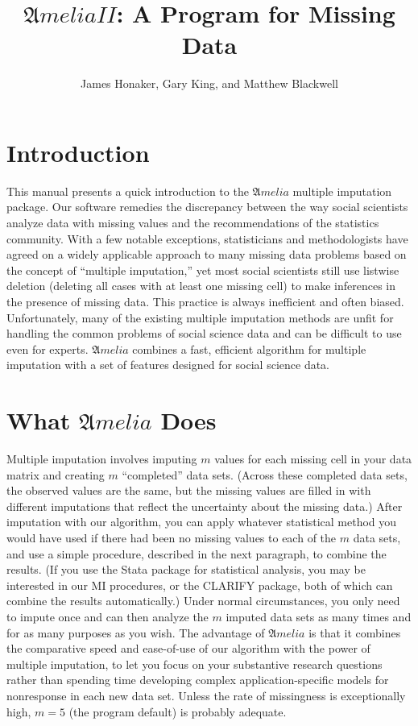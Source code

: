 \documentclass[12pt,titlepage]{article}
\title{${\mathfrak Amelia II}$: A Program for Missing Data}
\author{James Honaker, Gary King, and Matthew Blackwell}
\begin{document}
\maketitle

\tableofcontents
\newpage

\section{Introduction}
\label{sec:intro}

This manual presents a quick introduction to the ${\mathfrak Amelia}$
multiple imputation package.  Our software remedies the discrepancy
between the way social scientists analyze data with missing values and
the recommendations of the statistics community. With a few notable
exceptions, statisticians and methodologists have agreed on a widely
applicable approach to many missing data problems based on the concept
of ``multiple imputation,'' yet most social scientists still use
listwise deletion (deleting all cases with at least one missing cell)
to make inferences in the presence of missing data. This practice is
always inefficient and often biased. Unfortunately, many of the
existing multiple imputation methods are unfit for handling the common
problems of social science data and can be difficult to use even for
experts.  ${\mathfrak Amelia}$ combines a fast, efficient algorithm
for multiple imputation with a set of features designed for social
science data.

\section{What ${\mathfrak Amelia}$ Does}
\label{sec:what}
Multiple imputation involves imputing $m$ values for each missing cell
in your data matrix and creating $m$ ``completed'' data sets.  (Across
these completed data sets, the observed values are the same, but the
missing values are filled in with different imputations that reflect
the uncertainty about the missing data.)  After imputation with our
algorithm, you can apply whatever statistical method you would have
used if there had been no missing values to each of the $m$ data sets,
and use a simple procedure, described in the next paragraph, to
combine the results.  (If you use the Stata package for statistical
analysis, you may be interested in our MI procedures, or the CLARIFY
package, both of which can combine the results automatically.)  Under
normal circumstances, you only need to impute once and can then
analyze the $m$ imputed data sets as many times and for as many
purposes as you wish.  The advantage of ${\mathfrak Amelia}$ is that
it combines the comparative speed and ease-of-use of our algorithm
with the power of multiple imputation, to let you focus on your
substantive research questions rather than spending time developing
complex application-specific models for nonresponse in each new data
set.  Unless the rate of missingness is exceptionally high, $m = 5$
(the program default) is probably adequate.
\end{document}
